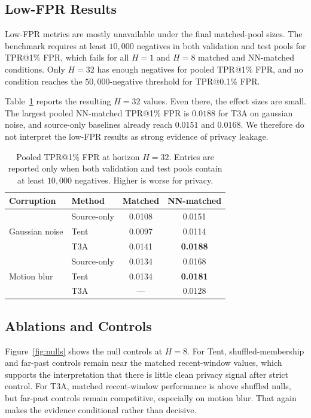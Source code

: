 \subsection{Low-FPR Results}

Low-FPR metrics are mostly unavailable under the final matched-pool sizes. The benchmark requires at least $10{,}000$ negatives in both validation and test pools for TPR@1\% FPR, which fails for all $H{=}1$ and $H{=}8$ matched and NN-matched conditions. Only $H{=}32$ has enough negatives for pooled TPR@1\% FPR, and no condition reaches the $50{,}000$-negative threshold for TPR@0.1\% FPR.

Table~\ref{tab:lowfpr} reports the resulting $H{=}32$ values. Even there, the effect sizes are small. The largest pooled NN-matched TPR@1\% FPR is $0.0188$ for T3A on gaussian noise, and source-only baselines already reach $0.0151$ and $0.0168$. We therefore do not interpret the low-FPR results as strong evidence of privacy leakage.

\begin{table}[t]
\caption{Pooled TPR@1\% FPR at horizon $H{=}32$. Entries are reported only when both validation and test pools contain at least $10{,}000$ negatives. Higher is worse for privacy.}
\label{tab:lowfpr}
\centering
\begin{tabular}{llcc}
\toprule
Corruption & Method & Matched & NN-matched \\
\midrule
\multirow{3}{*}{Gaussian noise}
& Source-only & 0.0108 & 0.0151 \\
& Tent & 0.0097 & 0.0114 \\
& T3A & 0.0141 & \textbf{0.0188} \\
\midrule
\multirow{3}{*}{Motion blur}
& Source-only & 0.0134 & 0.0168 \\
& Tent & 0.0134 & \textbf{0.0181} \\
& T3A & --- & 0.0128 \\
\bottomrule
\end{tabular}
\end{table}

\subsection{Ablations and Controls}

Figure~\ref{fig:nulls} shows the null controls at $H{=}8$. For Tent, shuffled-membership and far-past controls remain near the matched recent-window values, which supports the interpretation that there is little clean privacy signal after strict control. For T3A, matched recent-window performance is above shuffled nulls, but far-past controls remain competitive, especially on motion blur. That again makes the evidence conditional rather than decisive.

